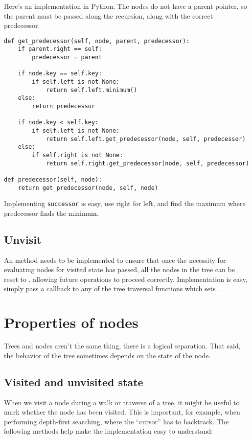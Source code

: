 \documentclass{article}
\begin{document}
\sno Here's an implementation in Python. \sno The nodes do not have a parent
pointer, so the parent must be passed along the recursion, along with
the correct predecessor.

\begin{lstlisting}[frame=single]
def get_predecessor(self, node, parent, predecessor):
    if parent.right == self:
        predecessor = parent

    if node.key == self.key:
        if self.left is not None:
            return self.left.minimum()
    else:
        return predecessor

    if node.key < self.key:
        if self.left is not None:
            return self.left.get_predecessor(node, self, predecessor)
    else:
        if self.right is not None:
            return self.right.get_predecessor(node, self, predecessor)

def predecessor(self, node):
    return get_predecessor(node, self, node)
\end{lstlisting}

\sno Implementing {\tt successor} is easy, use right for left, and find the
maximum where predecessor finds the minimum.

\subsection{Unvisit}

An  method needs to be implemented to ensure that once the
necessity for evaluating nodes for visited state has passed, all
the nodes in the tree can be reset to , allowing
future operations to proceed correctly. Implementation is easy,
simply pass a callback to any of the tree traversal functions which
sets .


\section{Properties of nodes}

Trees and nodes aren't the same thing, there is a logical separation.
That said, the behavior of the tree sometimes depends on the state of the
node.

\subsection{Visited and unvisited state}

When we visit a node during a walk or traverse of a tree, it might be
useful to mark whether the node has been visited. This is important, for
example, when performing depth-first searching, where the ``cursor'' has
to backtrack. The following methods help make the implementation easy
to understand:
\end{document}
